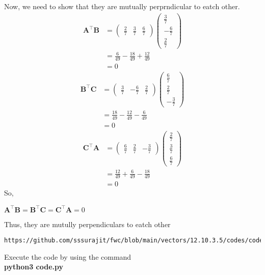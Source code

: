 \documentclass[journal,12pt,twocolumn]{IEEEtran}
\newcommand{\myvec}[1]{\ensuremath{\begin{pmatrix}#1\end{pmatrix}}}
\let\vec\mathbf
\begin{document}
Now, we need to show that they are mutually perprndicular to eatch other.
\begin{align}
\vec{A}^{\top}\vec{B}&=\myvec{\frac{2}{7}&\frac{3}{7}&\frac{6}{7}}\myvec{\frac{3}{7}\\-\frac{6}{7}\\ \frac{2}{7}}\\
&=\frac{6}{49}-\frac{18}{49}+\frac{12}{49}\\
&=0
\end{align}
\begin{align}
\vec{B}^{\top}\vec{C}&=\myvec{\frac{3}{7}&-\frac{6}{7}&\frac{2}{7}}\myvec{\frac{6}{7}\\ \frac{2}{7}\\-\frac{3}{7}}\\
&=\frac{18}{49}-\frac{12}{49}-\frac{6}{49}\\
&=0
\end{align}
\begin{align}
\vec{C}^{\top}\vec{A}&=\myvec{\frac{6}{7}&\frac{2}{7}&-\frac{3}{7}}\myvec{\frac{2}{7}\\ \frac{3}{7}\\ \frac{6}{7}}\\
&=\frac{12}{49}+\frac{6}{49}-\frac{18}{49}\\
&=0
\end{align}
So,\begin{center}
    $\vec{A}^{\top}\vec{B}=\vec{B}^{\top}\vec{C}=\vec{C}^{\top}\vec{A}=0$
\end{center}
Thus, they are mutully perpendiculars to eatch other
\begin{lstlisting}
https://github.com/sssurajit/fwc/blob/main/vectors/12.10.3.5/codes/code.py
\end{lstlisting}
Execute the code by using the command\\
\textbf{python3 code.py}
\end{document}
